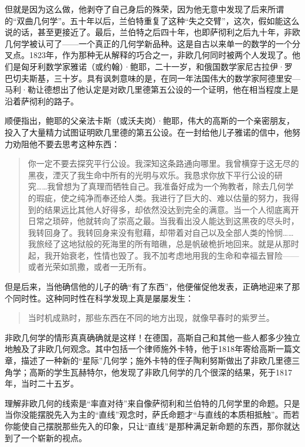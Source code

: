 但就是因为这么做，他剥夺了自己身后的殊荣，因为他无意中发现了后来所谓的“双曲几何学”。五十年以后，兰伯特重复了这种“失之交臂”，这次，假如能这么说的话，甚至更接近了。最后，兰伯特之后四十年，也即萨彻利之后九十年，非欧几何学被认可了——一个真正的几何学新品种。这是自古以来单一的数学的一个分叉点。1823年，作为那种无从解释的巧合之一，非欧几何同时被两个人发现了。他们是匈牙利数学家雅诺（或约翰）·鲍耶，二十一岁，和俄国数学家尼古拉伊·罗巴切夫斯基，三十岁。具有讽刺意味的是，在同一年法国伟大的数学家阿德里安—马利·勒让德想出了他认定是对欧几里德第五公设的一个证明，他在相当程度上是沿着萨彻利的路子。

顺便指出，鲍耶的父亲法卡斯（或沃夫岗）·鲍耶，伟大的高斯的一个亲密朋友，投入了大量精力试图证明欧几里德的第五公设。在一封给他儿子雅诺的信中，他努力劝阻他不要去思考这种东西：

\begin{quote}
你一定不要去探究平行公设。我深知这条路通向哪里。我曾横穿于这无尽的黑夜，湮灭了我生命中所有的光明与欢乐。我恳求你放下平行公设的研究……我曾想为了真理而牺牲自己。我准备好成为一个殉教者，除去几何学的瑕疵，使之纯净而奉还给人类。我进行了巨大的、难以估量的努力，我得到的结果远比其他人好得多，却依然没达到完全的满意。当一个人彻底离开日常之琐碎，他就转向了崇高之最。当我看出没人能达到这黑夜的尽头时，我转回身了。我转回身来没有慰藉，却带着对自己以及全部人类的怜悯……我旅经了这地狱般的死海里的所有暗礁，总是帆破桅折地回来。就是从那时起，我开始衰老，性情也毁了。我不加考虑地用我的生命和幸福去冒险——或者光荣如凯撒，或者一无所有。
\end{quote}

但是后来，当他确信他的儿子的确“有了东西”，他便催促他发表，正确地迎来了那个同时性。这种同时性在科学发现上真是屡屡发生：

\begin{quote}
当时机成熟时，那些东西在不同的地方出现，就像早春时的紫罗兰。
\end{quote}

非欧几何学的情形真真确确就是这样！在德国，高斯自己和其他一些人都多少独立地触及了非欧几何观念。其中包括一个律师施外卡特，他于1818年寄给高斯一篇文章，描述了一种新的“星际”几何学；施外卡特的侄子陶利努斯做出了非欧几里德三角学；高斯的学生瓦赫特尔，他发现了非欧几何学的几个很深的结果，死于1817年，当时二十五岁。

理解非欧几何的线索是“率直对待”来自像萨彻利和兰伯特的几何学里的命题。只是当你没能摆脱先入为主的“直线”观念时，萨氏命题才“与直线的本质相抵触”。而若你能使自己摆脱那些先入的印象，只让“直线”是那种满足新命题的东西，那你就达到了一个崭新的视点。

